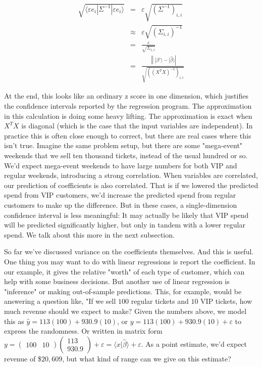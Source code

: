 \documentclass{amsbook}
\begin{document}
$$
\begin{array}{rcl}
\sqrt{\langle \varepsilon e_i|\Sigma^{-1}|\varepsilon e_i\rangle}&=&\varepsilon\sqrt{\left(\Sigma^{-1}\right)_{i,i}} \\
&\approx& \varepsilon\sqrt{\left(\Sigma_{i,i}\right)^{-1}} \\
&=& \frac{\varepsilon}{\sqrt{\Sigma_{i,i}}} \\
&=& \frac{\left\| |\beta'\rangle-|\hat\beta\rangle\right|}{\sqrt{\left(\left(X^TX\right)^{-1}\right)_{i,i}}}
\end{array}
$$

At the end, this looks like an ordinary z score in one dimension, which justifies the confidence intervals reported by the regression program.  The approximation in this calculation is doing some heavy lifting.  The approximation is exact when $X^TX$ is diagonal (which is the case that the input variables are independent).  In practice this is often close enough to correct, but there are real cases where this isn't true.  Imagine the same problem setup, but there are some "mega-event" weekends that we sell ten thousand tickets, instead of the usual hundred or so.  We'd expect mega-event weekends to have large numbers for both VIP and regular weekends, introducing a strong correlation.  When variables are correlated, our prediction of coefficients is also correlated.  That is if we lowered the predicted spend from VIP customers, we'd increase the predicted spend from regular customers to make up the difference.  But in these cases, a single-dimension confidence interval is less meaningful:  It may actually be likely that VIP spend will be predicted significantly higher, but only in tandem with a lower regular spend.  We talk about this more in the next subsection.

So far we've discussed variance on the coefficients themselves.  And this is useful.  One thing you may want to do with linear regressions is report the coefficient.  In our example, it gives the relative "worth" of each type of customer, which can help with some business decisions.  But another use of linear regression is "inference" or making out-of-sample predictions.  This, for example, would be answering a question like, "If we sell $100$ regular tickets and $10$ VIP tickets, how much revenue should we expect to make?  Given the numbers above, we model this as $\hat y=113(100)+930.9(10)$, or $y=113(100)+930.9(10)+\varepsilon$ to express the randomness.  Or written in matrix form $y=\left(\begin{array}{cc}100&10\end{array}\right)\left(\begin{array}{c}113\\930.9\end{array}\right)+\varepsilon=\langle x|\hat\beta\rangle+\varepsilon$.  As a point estimate, we'd expect revenue of \$$20,609$, but what kind of range can we give on this estimate?
\end{document}
